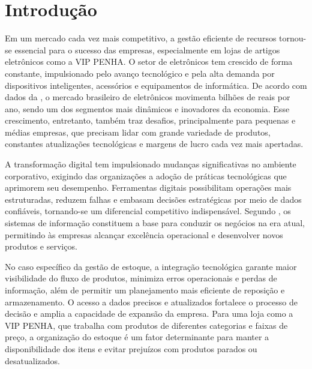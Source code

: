 \documentclass[
	12pt,				%
	openany,			%
	twoside,			%
	a4paper,			%
	english,			%
	brazil				%
	]{abntex2}
\begin{document}
\textual

\chapter{Introdução}
Em um mercado cada vez mais competitivo, a gestão eficiente de recursos tornou-se essencial para o sucesso das empresas, especialmente em lojas de artigos eletrônicos como a VIP PENHA. O setor de eletrônicos tem crescido de forma constante, impulsionado pelo avanço tecnológico e pela alta demanda por dispositivos inteligentes, acessórios e equipamentos de informática. De acordo com dados da , o mercado brasileiro de eletrônicos movimenta bilhões de reais por ano, sendo um dos segmentos mais dinâmicos e inovadores da economia. Esse crescimento, entretanto, também traz desafios, principalmente para pequenas e médias empresas, que precisam lidar com grande variedade de produtos, constantes atualizações tecnológicas e margens de lucro cada vez mais apertadas.

A transformação digital tem impulsionado mudanças significativas no ambiente corporativo, exigindo das organizações a adoção de práticas tecnológicas que aprimorem seu desempenho. Ferramentas digitais possibilitam operações mais estruturadas, reduzem falhas e embasam decisões estratégicas por meio de dados confiáveis, tornando-se um diferencial competitivo indispensável. Segundo , os sistemas de informação constituem a base para conduzir os negócios na era atual, permitindo às empresas alcançar excelência operacional e desenvolver novos produtos e serviços.

No caso específico da gestão de estoque, a integração tecnológica garante maior visibilidade do fluxo de produtos, minimiza erros operacionais e perdas de informação, além de permitir um planejamento mais eficiente de reposição e armazenamento. O acesso a dados precisos e atualizados fortalece o processo de decisão e amplia a capacidade de expansão da empresa. Para uma loja como a VIP PENHA, que trabalha com produtos de diferentes categorias e faixas de preço, a organização do estoque é um fator determinante para manter a disponibilidade dos itens e evitar prejuízos com produtos parados ou desatualizados.
\end{document}
